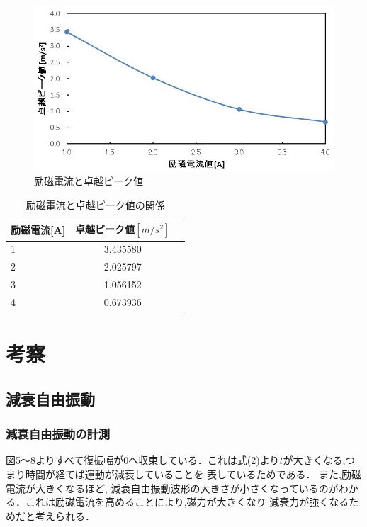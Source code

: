\documentclass[a4paper,10.5pt]{jsarticle}
\begin{document}
\begin{figure}[h]
  \centering
  \includegraphics[width=14cm]{11.png}
  \caption{励磁電流と卓越ピーク値}
\end{figure}
\newpage
\begin{table}[h]
  \centering
  \caption{励磁電流と卓越ピーク値の関係}
  \begin{tabular}{l|c|r}
    励磁電流[A]&卓越ピーク値$[m/s^2]$\\\hline\hline
      1&3.435580 \\ \hline
      2&2.025797  \\
      3&1.056152  \\
      4&0.673936  \\\hline
  \end{tabular}
\end{table}

\section{考察}
\subsection{減衰自由振動}
\subsubsection{減衰自由振動の計測}
図5〜8よりすべて復振幅が0へ収束している．これは式(2)より$t$が大きくなる,つまり時間が経てば運動が減衰していることを
表しているためである．
また,励磁電流が大きくなるほど,
減衰自由振動波形の大きさが小さくなっているのがわかる．これは励磁電流を高めることにより,磁力が大きくなり
減衰力が強くなるためだと考えられる．
\end{document}

